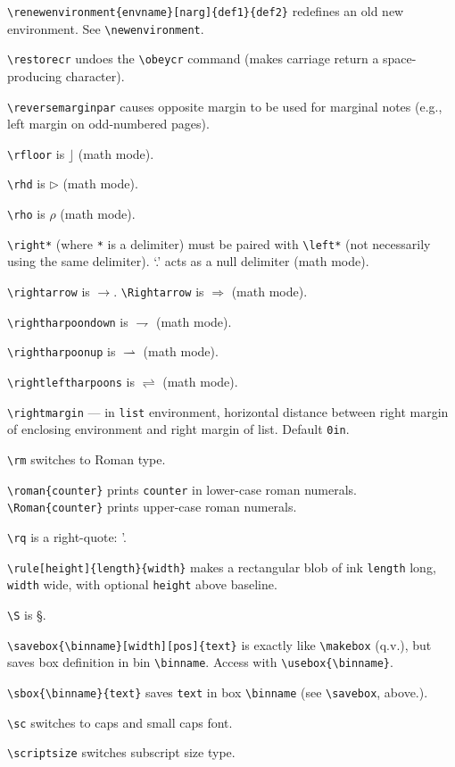 \verb"\renewenvironment{envname}[narg]{def1}{def2}" redefines an old new
	environment.  See \verb"\newenvironment".

\verb"\restorecr" undoes the \verb"\obeycr" command (makes carriage return
	a space-producing character).

\verb"\reversemarginpar" causes opposite margin to be used for marginal
	notes (e.g., left margin on odd-numbered pages).

\verb"\rfloor" is $\rfloor$ (math mode).

\verb"\rhd" is $\rhd$ (math mode).

\verb"\rho" is $\rho$ (math mode).

\verb"\right*" (where \verb"*" is a delimiter) must be paired with
	\verb"\left*" (not necessarily using the same delimiter).
	`.' acts as a null delimiter (math mode).

\verb"\rightarrow" is $\rightarrow$.
	\verb"\Rightarrow" is $\Rightarrow$ (math mode).

\verb"\rightharpoondown" is $\rightharpoondown$ (math mode).

\verb"\rightharpoonup" is $\rightharpoonup$ (math mode).

\verb"\rightleftharpoons" is $\rightleftharpoons$ (math mode).

\verb"\rightmargin" --- in \verb"list" environment, horizontal distance
	between right margin of enclosing environment and right margin of
	list. Default \verb"0in".

\verb"\rm" switches to {\rm Roman} type.

\verb"\roman{counter}" prints \verb"counter" in lower-case roman numerals.
	\verb"\Roman{counter}" prints upper-case roman numerals.

\verb"\rq" is a right-quote: \rq.

\verb"\rule[height]{length}{width}" makes a rectangular blob of ink
	\verb"length" long, \verb"width" wide, with optional \verb"height"
	above baseline.

\verb"\S" is \S.

\verb"\savebox{\binname}[width][pos]{text}" is exactly like \verb"\makebox"
	(q.v.), but saves box definition in bin \verb"\binname". Access
	with \verb"\usebox{\binname}".

\verb"\sbox{\binname}{text}" saves \verb"text" in box \verb"\binname" (see
	\verb"\savebox", above.).

\verb"\sc" switches to caps and small caps font.

\verb"\scriptsize" switches subscript size type.

